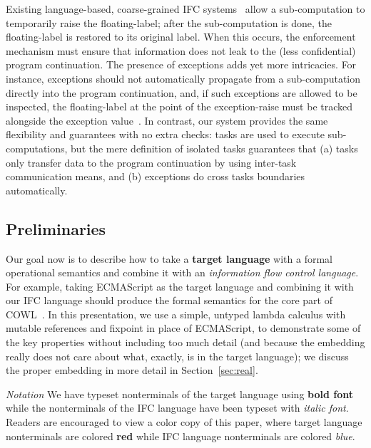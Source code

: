 Existing language-based, coarse-grained IFC
systems~\cite{Hritcu:2013:YIB:2497621.2498098,stefan:2012:arxiv-flexible}
allow a sub-computation to temporarily raise the floating-label; after
the sub-computation is done, the floating-label is restored to its
original label. When this occurs, the enforcement mechanism must
ensure that information does not leak to the (less confidential)
program continuation. The presence of exceptions adds yet more
intricacies.  For instance, exceptions should not automatically
propagate from a sub-computation directly into the program
continuation, and, if such exceptions are allowed to be inspected, the
floating-label at the point of the exception-raise must be tracked
alongside the exception
value~\cite{Hritcu:2013:YIB:2497621.2498098,stefan:2012:arxiv-flexible,Hedin:2012}.
In contrast, our system
provides the same flexibility and guarantees with no extra checks: tasks
are used to execute sub-computations, but the mere definition of
isolated tasks guarantees that (a) tasks only transfer data to the
program continuation by using inter-task communication means, and (b)
exceptions do cross tasks boundaries automatically.


\subsection{Preliminaries}

Our goal now is to
describe how to take a \textbf{{\color{red} target
language}} with a formal operational semantics and combine it with an
\textit{{\color{blue} information flow control language}}.  For example,
taking ECMAScript as the target language and combining it with our IFC
language should produce the formal semantics for the core part of COWL~\cite{swapi}.  In this
presentation, we use a simple, untyped lambda calculus with mutable
references and fixpoint in place of ECMAScript, to demonstrate some of the key
properties without including too much detail (and because the embedding really
does not care about what, exactly, is in the target language); we discuss the proper
embedding in more detail in Section~\ref{sec:real}.

\vspace{1pt}
\noindent
\textit{Notation}
We have typeset nonterminals of the target language using \textbf{{\color{red}
bold font}} while the nonterminals of the IFC language have been typeset
with \textit{{\color{blue} italic font}}.  Readers are encouraged to view
a color copy of this paper, where target language nonterminals are colored \textbf{{\color{red} red}}
while IFC language nonterminals are colored \textit{{\color{blue} blue}}.

